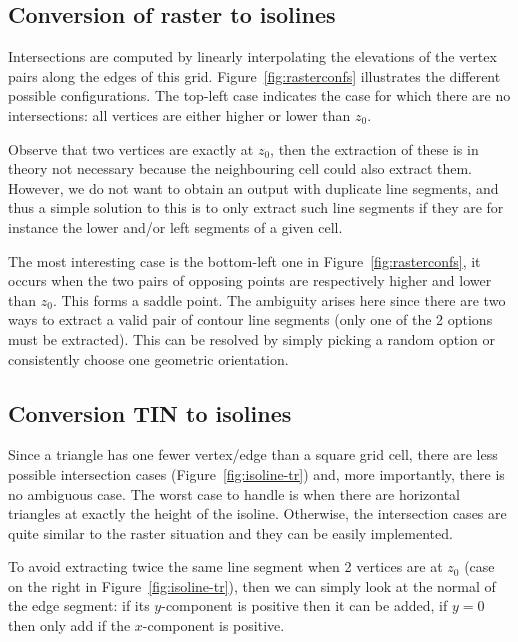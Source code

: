 \subsection{Conversion of raster to isolines}%
\label{sec:r-iso}

Intersections are computed by linearly interpolating the elevations of the vertex pairs along the edges of this grid.
Figure~\ref{fig:rasterconfs} illustrates the different possible configurations. 
The top-left case indicates the case for which there are no intersections: all vertices are either higher or lower than $z_0$. 

Observe that two vertices are exactly at $z_0$, then the extraction of these is in theory not necessary because the neighbouring cell could also extract them. 
However, we do not want to obtain an output with duplicate line segments, and thus a simple solution to this is to only extract such line segments if they are for instance the lower and/or left segments of a given cell.

The most interesting case is the bottom-left one in Figure~\ref{fig:rasterconfs}, it occurs when the two pairs of opposing points are respectively higher and lower than $z_0$.
This forms a saddle point. 
The ambiguity arises here since there are two ways to extract a valid pair of contour line segments (only one of the 2 options must be extracted).
This can be resolved by simply picking a random option or consistently choose one geometric orientation. 


\subsection{Conversion TIN to isolines}
\label{sec:tin-iso}

Since a triangle has one fewer vertex/edge than a square grid cell, there are less possible intersection cases (Figure~\ref{fig:isoline-tr}) and, more importantly, there is no ambiguous case. 
The worst case to handle is when there are horizontal triangles at exactly the height of the isoline.
Otherwise, the intersection cases are quite similar to the raster situation and they can be easily implemented.

To avoid extracting twice the same line segment when 2 vertices are at $z_0$ (case on the right in Figure~\ref{fig:isoline-tr}), then we can simply look at the normal of the edge segment: if its $y$-component is positive then it can be added, if $y=0$ then only add if the $x$-component is positive.

